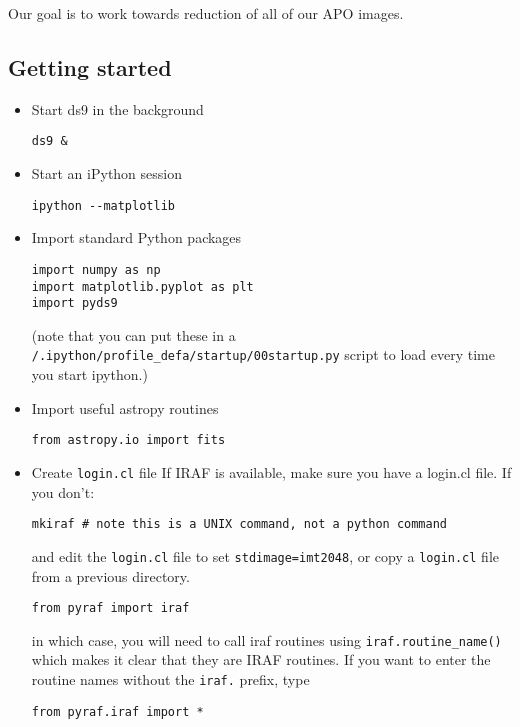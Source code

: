 \documentclass{article}
\begin{document}
Our goal is to work towards reduction of all of our APO images.

\subsection*{Getting started}
\begin{itemize}
\item Start ds9 in the background
\begin{verbatim}
ds9 &
\end{verbatim}
\item Start an iPython session
\begin{verbatim}
ipython --matplotlib
\end{verbatim}

\item Import standard Python packages
\begin{verbatim}
import numpy as np
import matplotlib.pyplot as plt
import pyds9
\end{verbatim}
(note that you can put these in a
\texttt{/.ipython/profile\_defa/startup/00startup.py}
script to load every time you start ipython.)

\item Import useful astropy routines
\begin{verbatim}
from astropy.io import fits
\end{verbatim}

\item Create \texttt{login.cl} file
If IRAF is available, make sure you have a login.cl file. If you don't:
\begin{verbatim}
mkiraf # note this is a UNIX command, not a python command
\end{verbatim}
and edit the \texttt{login.cl} file to set \texttt{stdimage=imt2048},
or copy a \texttt{login.cl} file from a previous directory.
\begin{verbatim}
from pyraf import iraf
\end{verbatim}
in which case, you will need to call iraf routines using
\texttt{iraf.routine\_name()}
which makes it clear that they are IRAF routines. If you want to
enter the routine names without the \texttt{iraf.} prefix, type
\begin{verbatim}
from pyraf.iraf import *
\end{verbatim}
\end{itemize}
\end{document}
